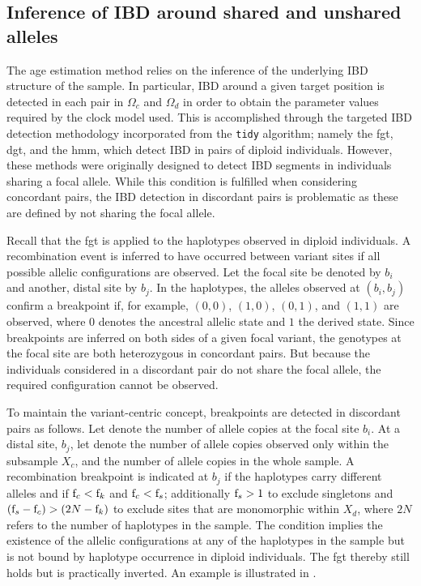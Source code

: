 %
\subsection{Inference of IBD around shared and unshared alleles}
%

The age estimation method relies on the inference of the underlying IBD structure of the sample.
In particular, IBD around a given target position is detected in each pair in $\Omega_c$ and $\Omega_d$ in order to obtain the parameter values required by the clock model used.
This is accomplished through the targeted IBD detection methodology incorporated from the \texttt{tidy} algorithm; namely the \gls{fgt}, \gls{dgt}, and the \gls{hmm}, which detect IBD in pairs of diploid individuals.
However, these methods were originally designed to detect IBD segments in individuals sharing a focal allele.
While this condition is fulfilled when considering concordant pairs, the IBD detection in discordant pairs is problematic as these are defined by not sharing the focal allele.

%

%

Recall that the \gls{fgt} is applied to the  haplotypes observed in  diploid individuals.
A recombination event is inferred to have occurred between  variant sites if all  possible allelic configurations are observed.
Let the focal site be denoted by $b_i$ and another, distal site by $b_j$.
In the  haplotypes, the alleles observed at ${(b_i,b_j)}$ confirm a breakpoint if, for example, ${(0,0)}$, ${(1,0)}$, ${(0,1)}$, and ${(1,1)}$ are observed, where $0$ denotes the ancestral allelic state and $1$ the derived state.
Since breakpoints are inferred on both sides of a given focal variant, the genotypes at the focal site are both heterozygous in concordant pairs.
But because the  individuals considered in a discordant pair do not share the focal allele, the required configuration cannot be observed.

To maintain the variant-centric concept, breakpoints are detected in discordant pairs as follows.
Let \fk{} denote the number of allele copies at the focal site $b_i$.
At a distal site, $b_j$, let  denote the number of allele copies observed only within the subsample $X_c$, and  the number of allele copies in the whole sample.
A recombination breakpoint is indicated at $b_j$ if the  haplotypes carry different alleles and if ${\fk{c} < \fk{}}$ and ${\fk{c} < \fk{s}}$; additionally ${\fk{s} > 1}$ to exclude singletons and ${(\fk{s} - \fk{c}) > (2N - \fk{})}$ to exclude sites that are monomorphic within $X_d$, where $2N$ refers to the number of haplotypes in the sample.
The condition implies the existence of the  allelic configurations at any of the haplotypes in the sample but is not bound by haplotype occurrence in  diploid individuals.
The \gls{fgt} thereby still holds but is practically inverted.
An example is illustrated in .


